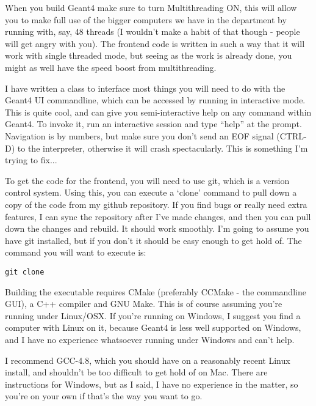 \documentclass{article}
\begin{document}
When you build Geant4 make sure to turn Multithreading ON, this will allow you to make full use of the bigger computers we have in the department by running with, say, 48 threads (I wouldn't make a habit of that though - people will get angry with you). The frontend code is written in such a way that it will work with single threaded mode, but seeing as the work is already done, you might as well have the speed boost from multithreading.

I have written a class to interface most things you will need to do with the Geant4 UI commandline, which can be accessed by running in interactive mode. This is quite cool, and can give you semi-interactive help on any command within Geant4. To invoke it, run an interactive session and type ``help'' at the prompt. Navigation is by numbers, but make sure you don't send an EOF signal (CTRL-D) to the interpreter, otherwise it will crash spectacularly. This is something I'm trying to fix...

To get the code for the frontend, you will need to use git, which is a version control system. Using this, you can execute a `clone' command to pull down a copy of the code from my github repository. If you find bugs or really need extra features, I can sync the repository after I've made changes, and then you can pull down the changes and rebuild. It should work smoothly. I'm going to assume you have git installed, but if you don't it should be easy enough to get hold of. The command you will want to execute is:
\begin{verbatim}
git clone 
\end{verbatim}

Building the executable requires CMake (preferably CCMake - the commandline GUI), a C++ compiler and GNU Make. This is of course assuming you're running under Linux/OSX. If you're running on Windows, I suggest you find a computer with Linux on it, because Geant4 is less well supported on Windows, and I have no experience whatsoever running under Windows and can't help.

I recommend GCC-4.8, which you should have on a reasonably recent Linux install, and shouldn't be too difficult to get hold of on Mac. There are instructions for Windows, but as I said, I have no experience in the matter, so you're on your own if that's the way you want to go.
\end{document}
